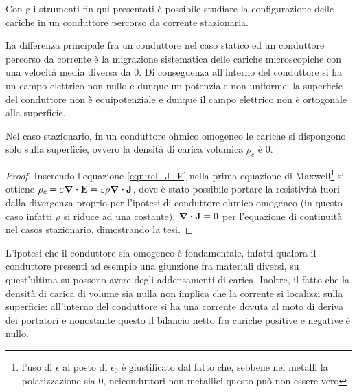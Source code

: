Con gli strumenti fin qui presentati è possibile studiare la configurazione delle cariche
in un conduttore percorso da corrente stazionaria.

La differenza principale fra un conduttore nel caso statico ed un conduttore percorso da
corrente è la migrazione sistematica delle cariche microscopiche con una velocità media
diversa da $0$. Di conseguenza all'interno del conduttore si ha un campo elettrico non nullo
e dunque un potenziale non uniforme: la superficie del conduttore non è equipotenziale
e dunque il campo elettrico non è ortogonale alla superficie.

\begin{thm}
Nel caso stazionario, in un conduttore ohmico omogeneo le cariche si dispongono solo sulla
superficie, ovvero la densità di carica volumica $\rho_c$ è $0$.
\end{thm}
\begin{proof}
    Inserendo l'equazione \eqref{eqn:rel_J_E} nella prima equazione di Maxwell\footnote{l'uso
    di $\epsilon$ al posto di $\epsilon_0$ è giustificato dal fatto che, sebbene nei metalli
    la polarizzazione sia $0$, neiconduttori non metallici questo può non essere vero} si ottiene
    $\rho_c=\varepsilon\div{\vb{E}}=\varepsilon\rho\div{\vb{J}}$, dove è stato possibile portare
    la resistività fuori dalla divergenza proprio per l'ipotesi di conduttore ohmico omogeneo (in
    questo caso infatti $\rho$ si riduce ad una costante).  $\div{\vb{J}}=0$ per
    l'equazione di continuità nel casos stazionario, dimostrando la tesi.
\end{proof}
L'ipotesi che il conduttore sia omogeneo è fondamentale, infatti qualora il conduttore presenti
ad esempio una giunzione fra materiali diversi, su quest'ultima su possono avere degli addensamenti
di carica. Inoltre, il fatto che la densità di carica di volume sia nulla non implica che la
corrente si localizzi sulla superficie: all'interno del conduttore si ha una corrente dovuta
al moto di deriva dei portatori e nonostante questo il bilancio netto fra cariche positive e
negative è nullo.


